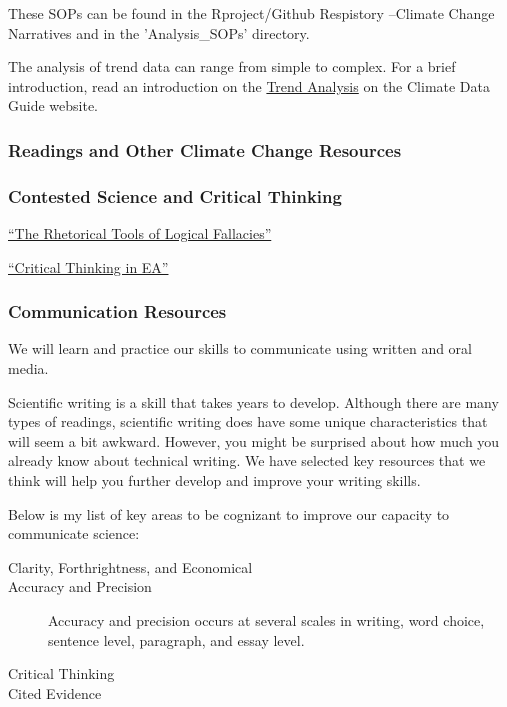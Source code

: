 \documentclass{article}\usepackage[]{graphicx}\usepackage[]{color}
\newenvironment{itemize*}%
  {\begin{itemize}%
    \setlength{\itemsep}{0pt}%
    \setlength{\parskip}{0pt}}%
  {\end{itemize}}
\begin{document}
These SOPs can be found in the Rproject/Github Respistory --Climate Change Narratives and in the 'Analysis\_SOPs' directory.

The analysis of trend data can range from simple to complex. For a brief introduction, read an introduction on the \href{https://climatedataguide.ucar.edu/climate-data-tools-and-analysis/trend-analysis}{Trend Analysis} on the Climate Data Guide website.

\subsubsection{Readings and Other Climate Change Resources}

\subsubsection{Contested Science and Critical Thinking}


\begin{itemize*}
  \item \href{https://github.com/marclos/Climate_Change_Narratives/raw/master/Communication_Resources/Logical_Fallacies.pdf}{``The Rhetorical Tools of Logical Fallacies''}
  
  \item \href{https://github.com/marclos/Climate_Change_Narratives/raw/master/Communication_Resources/Critical_Thinking.pdf}{``Critical Thinking in EA''}
\end{itemize*}

\subsubsection{Communication Resources}

We will learn and practice our skills to communicate using written and oral media. 

Scientific writing is a skill that takes years to develop. Although there are many types of readings, scientific writing does have some unique characteristics that will seem a bit awkward. However, you might be surprised about how much you already know about technical writing. We have selected key resources that we think will help you further develop and improve your writing skills.

Below is my list of key areas to be cognizant to improve our capacity to communicate science:

\begin{description}
  \item[Clarity, Forthrightness, and Economical]
  \item[Accuracy and Precision] Accuracy and precision occurs at several scales in writing, word choice, sentence level, paragraph, and essay level. 
  \item[Critical Thinking]
  \item[Cited Evidence]
\end{description}
\end{document}
